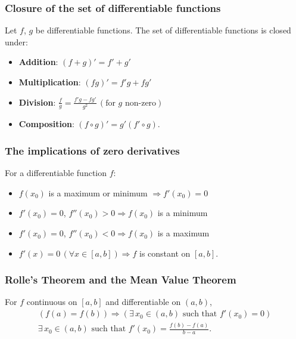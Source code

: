 \documentclass[a4paper, 12pt, twoside]{article}
\begin{document}
\subsubsection{Closure of the set of differentiable functions}

Let $f$, $g$ be differentiable functions. The set of differentiable
functions is closed under:

\begin{itemize}
      \item \textbf{Addition}: $(f + g)' = f' + g'$
      \item \textbf{Multiplication}: $(fg)' = f'g + fg'$
      \item \textbf{Division}: $\frac{f}{g} =
                  \frac{f'g - fg'}{g^2} \, (\text{for $g$ non-zero})$
      \item \textbf{Composition}: $(f \circ g)' = g'(f' \circ g)$.
\end{itemize}

\subsubsection{The implications of zero derivatives}

For a differentiable function $f$:

\begin{itemize}
      \item $f(x_0)$ is a maximum or minimum $\Rightarrow
                  f'(x_0) = 0$
      \item $f'(x_0) = 0$, $f''(x_0) > 0 \Rightarrow f(x_0)$ is
            a minimum
      \item $f'(x_0) = 0$, $f''(x_0) < 0 \Rightarrow f(x_0)$ is
            a maximum
      \item $f'(x) = 0 \, (\forall x \in [a, b]) \Rightarrow
                  f$ is constant on $[a, b]$.
\end{itemize}

\subsubsection{Rolle's Theorem and the Mean Value Theorem}

For $f$ continuous on $[a, b]$ and differentiable on $(a, b)$,
\begin{align*}
      (f(a) = f(b)) \Rightarrow (\exists \, x_0 \in (a, b)
      \text{ such that } f'(x_0) = 0) \tag{Rolle's Theorem} \\
      \exists \, x_0 \in (a, b) \text{ such that } f'(x_0)
      = \frac{f(b) - f(a)}{b - a}. \tag{Mean Value Theorem}
\end{align*}
\end{document}
